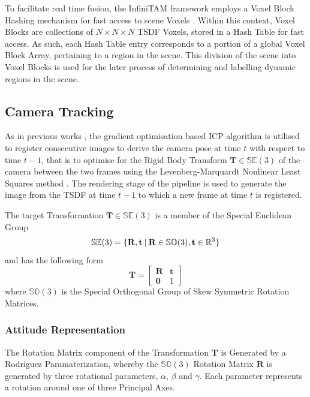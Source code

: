 To facilitate real time fusion, the InfiniTAM framework employs a Voxel Block
Hashing mechanism for fast access to scene Voxels \cite{NieBner2013}. Within
this context, Voxel Blocks are collections of $N \times N \times N$ TSDF Voxels,
stored in a Hash Table for fast access. As such, each Hash Table entry
corresponds to a portion of a global Voxel Block Array, pertaining to a region
in the scene. This division of the scene into Voxel Blocks is used for the later
process of determining and labelling dynamic regions in the scene.

\subsection{Camera Tracking}
\label{subsec:moseg_static_camera_tracking}
As in previous works \cite{Newcombe2011, Prisacariu2014}, the gradient
optimisation based ICP algorithm is utilised to register consecutive images
to derive the camera pose at time $t$ with respect to time $t-1$, that is to
optimise for the Rigid Body Transform $\mathbf{T} \in \mathbb{SE}(3)$ of the
camera between the two frames using the Levenberg-Marquardt Nonlinear Least
Squares method \cite{NumericalRecipes}. The rendering stage of the pipeline
is used to generate the image from the TSDF  at time $t-1$ to which a new frame
at time $t$ is registered.

The target Transformation $\mathbf{T} \in \mathbb{SE}(3)$ is a member of the
Special Euclidean Group
\begin{equation}
  \label{eqn:se3_definition}
  \mathbb{SE}(3) = \{\mathbf{R}, \mathbf{t} \:\vert\: \mathbf{R} \in
  \mathbb{SO}(3), \mathbf{t} \in \mathbb{R}^{3}\}
\end{equation}
and has the following form
\begin{equation}
  \label{eqn:trans_mat_definition}
  \mathbf{T} =
  \begin{bmatrix}
    \mathbf{R} & \mathbf{t} \\
    \mathbf{0} & 1
  \end{bmatrix}
\end{equation}
where $\mathbb{SO}(3)$ is the Special Orthogonal Group of Skew Symmetric
Rotation Matrices.

\subsubsection{Attitude Representation}
\label{subsub:moseg_static_camera_attitude}
The Rotation Matrix component of the Transformation $\mathbf{T}$ is
Generated by a Rodriguez Paramaterization\cite{Shuster1993}, whereby the
$\mathbb{SO}(3)$ Rotation Matrix $\mathbf{R}$ is generated by three rotational
parameters, $\alpha$, $\beta$ and $\gamma$. Each parameter represents a rotation
around one of three Principal Axes.

